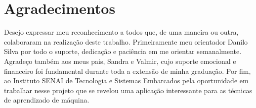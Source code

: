 \thispagestyle{plain}

\section*{Agradecimentos}

\noindent Desejo expressar meu reconhecimento a todos que, de uma maneira ou outra, colaboraram na realização deste trabalho. Primeiramente meu orientador Danilo Silva por todo o suporte, dedicação e paciência em me orientar semanalmente. Agradeço também aos meus pais, Sandra e Valmir, cujo suporte emocional e financeiro foi fundamental durante toda a extensão de minha graduação. Por fim, ao Instituto SENAI de Tecnologia e Sistemas Embarcados pela oportunidade em trabalhar nesse projeto que se revelou uma aplicação interessante para as técnicas de aprendizado de máquina.

\cleardoublepageempty
